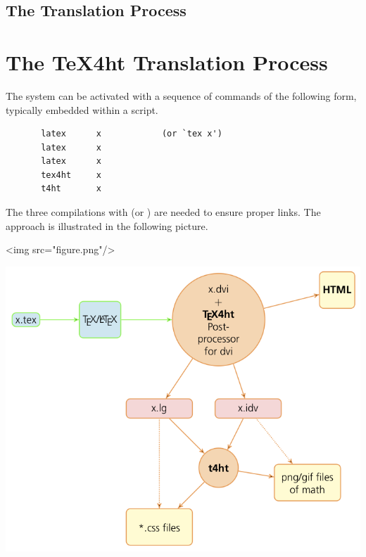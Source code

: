 \documentclass[a4paper]{article}
\begin{document}
\section{The Translation Process}
\else
\chapter{The \TeX4ht Translation Process}
\fi

The system can be activated with a sequence of
commands of the following form, typically embedded within a script.

\begin{verbatim}
       latex      x            (or `tex x')
       latex      x
       latex      x
       tex4ht     x
       t4ht       x
\end{verbatim}


The three compilations with \latex (or \tex) are needed to ensure
proper links.  The approach is illustrated in the following picture.

\ifhtml
 \Tg<img src="figure.png"/>
\else
 \begin{center}
  \includegraphics{figure.png}
 \end{center}
\fi
\end{document}
